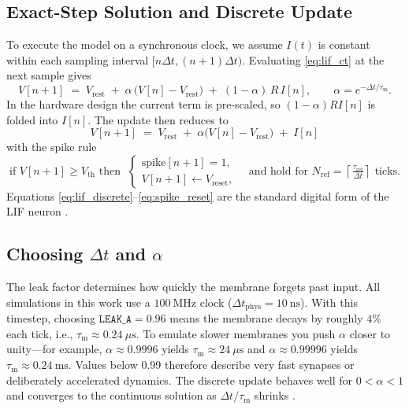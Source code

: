\documentclass[10pt,onecolumn]{IEEEtran}
\newcommand{\Vrest}{V_{\mathrm{rest}}}
\newcommand{\Vreset}{V_{\mathrm{reset}}}
\newcommand{\Vth}{V_{\mathrm{th}}}
\newcommand{\taum}{\tau_{\mathrm{m}}}
\newcommand{\tref}{\tau_{\mathrm{ref}}}
\begin{document}
\subsection*{Exact-Step Solution and Discrete Update}
To execute the model on a synchronous clock, we assume \(I(t)\) is constant within each sampling interval \([n\Delta t,(n+1)\Delta t)\). Evaluating \eqref{eq:lif_ct} at the next sample gives
\begin{equation}
V[n{+}1] \;=\; \Vrest \;+\; \alpha\,\bigl(V[n]-\Vrest\bigr) \;+\; (1-\alpha)\,R\,I[n],
\qquad \alpha=e^{-\Delta t/\taum}.
\label{eq:lif_exact}
\end{equation}
In the hardware design the current term is pre-scaled, so \((1-\alpha) R I[n]\) is folded into \(I[n]\). The update then reduces to
\begin{equation}
\boxed{\,V[n{+}1] \;=\; \Vrest \;+\; \alpha\bigl(V[n]-\Vrest\bigr) \;+\; I[n]\,}
\label{eq:lif_discrete}
\end{equation}
with the spike rule
\begin{equation}
\text{if } V[n{+}1]\ge \Vth \text{ then }\;
\begin{cases}
\text{spike}[n{+}1]=1,\\[2pt]
V[n{+}1]\leftarrow \Vreset,
\end{cases}
\quad
\text{and hold for } N_{\mathrm{ref}}=\left\lceil \tfrac{\tref}{\Delta t}\right\rceil \text{ ticks.}
\label{eq:spike_reset}
\end{equation}
Equations \eqref{eq:lif_discrete}–\eqref{eq:spike_reset} are the standard digital form of the LIF neuron \cite{GerstnerKistler2002,Maass1997,IndiveriLiu2015}.

\subsection*{Choosing \(\Delta t\) and \(\alpha\)}
The leak factor determines how quickly the membrane forgets past input. All simulations in this work use a \(100~\mathrm{MHz}\) clock (\(\Delta t_\text{phys}=10~\mathrm{ns}\)). With this timestep, choosing \(\texttt{LEAK\_A}=0.96\) means the membrane decays by roughly \(4\%\) each tick, i.e., \(\taum \approx 0.24~\mu\mathrm{s}\). To emulate slower membranes you push \(\alpha\) closer to unity—for example, \(\alpha\approx 0.9996\) yields \(\taum\approx 24~\mu\mathrm{s}\) and \(\alpha\approx 0.99996\) yields \(\taum\approx 0.24~\mathrm{ms}\). Values below 0.99 therefore describe very fast synapses or deliberately accelerated dynamics. The discrete update behaves well for \(0<\alpha<1\) and converges to the continuous solution as \(\Delta t/\taum\) shrinks \cite{GerstnerKistler2002,Maass1997}.
\end{document}
